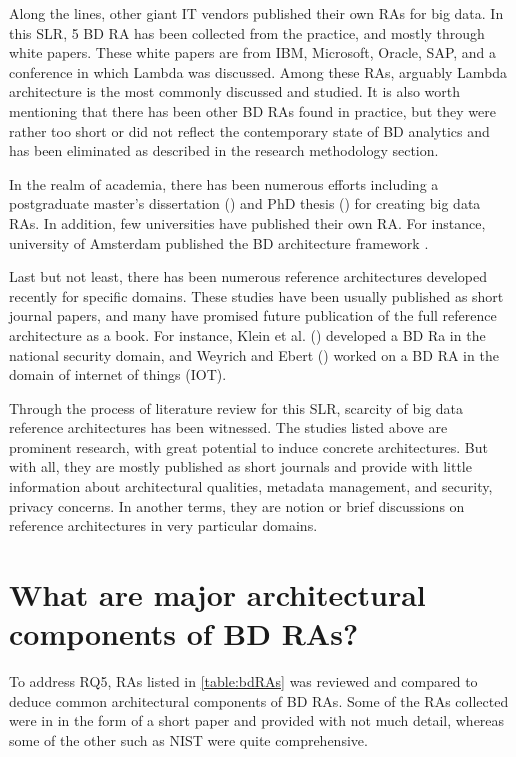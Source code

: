 \documentclass[review]{elsarticle}
\begin{document}
Along the lines, other giant IT vendors published their own RAs for big data. In this SLR, 5 BD RA has been collected from the practice, and mostly through white papers. These white papers are from IBM, Microsoft, Oracle, SAP, and a conference in which Lambda was discussed. Among these RAs, arguably Lambda architecture is the most commonly discussed and studied. It is also worth mentioning that there has been other BD RAs found in practice, but they were rather too short or did not reflect the contemporary state of BD analytics and has been eliminated as described in the research methodology section.

In the realm of academia, there has been numerous efforts including a postgraduate master’s dissertation (\cite{Maier}) and PhD thesis (\cite{suthakar2017scalable}) for creating big data RAs. In addition, few universities have published their own RA. For instance, university of Amsterdam published the BD architecture framework \cite{framework2015draft}. 

Last but not least, there has been numerous reference architectures developed recently for specific domains. These studies have been usually published as short journal papers, and many have promised future publication of the full reference architecture as a book. For instance, Klein et al. (\cite{Klein}) developed a BD Ra in the national security domain, and Weyrich and Ebert (\cite{weyrich2015reference}) worked on a BD RA in the domain of internet of things (IOT). 

Through the process of literature review for this SLR, scarcity of big data reference architectures has been witnessed. The studies listed above are prominent research, with great potential to induce concrete architectures. But with all, they are mostly published as short journals and provide with little information about architectural qualities, metadata management, and security, privacy concerns. In another terms, they are notion or brief discussions on reference architectures in very particular domains.

\section{What are major architectural components of BD RAs? }

To address RQ5, RAs listed in \ref{table:bdRAs} was reviewed and compared to deduce common architectural components of BD RAs. Some of the RAs collected were in in the form of a short paper and provided with not much detail, whereas some of the other such as NIST were quite comprehensive. 
\end{document}
